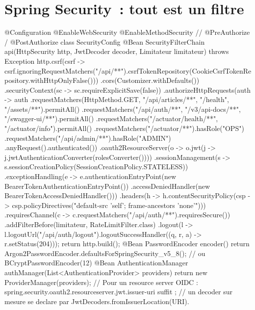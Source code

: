 \documentclass[12pt,a4paper,twoside,openright]{book}
\begin{document}
\section{Spring Security~: tout est un filtre}

\begin{codejava}
@Configuration
@EnableWebSecurity
@EnableMethodSecurity                                    // @PreAuthorize / @PostAuthorize
class SecurityConfig {
    @Bean
    SecurityFilterChain api(HttpSecurity http, JwtDecoder decoder, Limitateur limitateur) throws Exception {
        http.csrf(csrf -> csrf.ignoringRequestMatchers("/api/**").csrfTokenRepository(CookieCsrfTokenRepository.withHttpOnlyFalse()))
            .cors(Customizer.withDefaults())
            .securityContext(sc -> sc.requireExplicitSave(false))
            .authorizeHttpRequests(auth -> auth
                .requestMatchers(HttpMethod.GET, "/api/articles/**", "/health", "/assets/**").permitAll()
                .requestMatchers("/api/auth/**", "/v3/api-docs/**", "/swagger-ui/**").permitAll()
                .requestMatchers("/actuator/health/**", "/actuator/info").permitAll()
                .requestMatchers("/actuator/**").hasRole("OPS")
                .requestMatchers("/api/admin/**").hasRole("ADMIN")
                .anyRequest().authenticated())
            .oauth2ResourceServer(o -> o.jwt(j -> j.jwtAuthenticationConverter(rolesConverter())))
            .sessionManagement(s -> s.sessionCreationPolicy(SessionCreationPolicy.STATELESS))
            .exceptionHandling(e -> e.authenticationEntryPoint(new BearerTokenAuthenticationEntryPoint())
                                    .accessDeniedHandler(new BearerTokenAccessDeniedHandler()))
            .headers(h -> h.contentSecurityPolicy(csp -> csp.policyDirectives("default-src 'self'; frame-ancestors 'none'")))
            .requiresChannel(c -> c.requestMatchers("/api/auth/**").requiresSecure())
            .addFilterBefore(limitateur, RateLimitFilter.class)
            .logout(l -> l.logoutUrl("/api/auth/logout").logoutSuccessHandler((q, r, a) -> r.setStatus(204)));
        return http.build();
    }
    @Bean PasswordEncoder encoder() {
        return Argon2PasswordEncoder.defaultsForSpringSecurity_v5_8();   // ou BCryptPasswordEncoder(12)
    }
    @Bean AuthenticationManager authManager(List<AuthenticationProvider> providers) { return new ProviderManager(providers); }
    // Pour un resource server OIDC : spring.security.oauth2.resourceserver.jwt.issuer-uri suffit ;
    // un decoder sur mesure se declare par JwtDecoders.fromIssuerLocation(URI).
}
\end{codejava}
\end{document}
